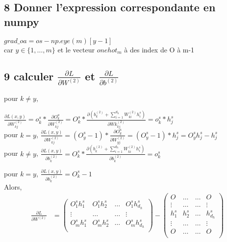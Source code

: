 \documentclass[12pt]{article}
\begin{document}
 \subsection{8 Donner l'expression correspondante en numpy}
$grad\_oa = os - np.eye(m)[y-1]$\\
car $y \in \{1,\dots,m\}$ et le vecteur $onehot_m$ à des index de O à m-1

 \subsection{9 calculer $\frac{\partial L}{\partial W^{(2)}}$ et $\frac{\partial L}{\partial b^{(2)}}$}
pour $k \neq y$,

$\frac{\partial L(x,y)}{\partial W_{kj}^{(2)}} = o_k^s*\frac{\partial O_k^a}{\partial W_{kj}^{(2)}}=O_k^s*\frac{\partial (b_k^{(2)} + \sum_{i=1}^{d_h}W_{ki}^{(2)}h_i^s)}{\partial Wk_{kj}^{(2)}} = o_k^s*h_j^s$\\

pour $k=y$,
$\frac{\partial L(x,y)}{\partial W_{kj}^{(2)}} = (O_y^s-1)*\frac{\partial O_y^a}{\partial W_{yj}^{(2)}} = (O_y^s-1)*h_j^s=O_y^sh_j^s-h_j^s$\\

pour $k \neq y$,
$\frac{\partial L(x,y)}{\partial b_k^{(2)}} = O_k^s*\frac{\partial (b_k^{(2)} + \sum_{i=1}^{d_h}W_{ki}^{(2)}h_i^s)}{\partial b_k^{(2)}} = o_k^s$

pour $k = y$,
$\frac{\partial L(x,y)}{\partial b_k^{(2)}} = O_k^s - 1$\\
Alors,\\
\begin{align*} 
    \frac{\partial L}{\partial W^{(2)}}
&=
     \left(
       \begin{array}{rrrr}
         O_1^sh_1^s &   O_1^sh_2^s &   \dots &   O_1^sh_{d_h}^s \\
        \vdots &  \dots &   \dots&   \vdots \\
         O_m^sh_1^s &   O_m^sh_2^s &   \dots &   O_m^sh_{d_h}^s \\
       \end{array}
      \right)  - 
	\left(
     \begin{array}{rrrr}
         O &   \dots &   \dots &   O\\
        \vdots &  \dots &   \dots&   \vdots \\
         h_1^s & h_2^s & \dots &h_{d_h}^s \\
 	\vdots &  \dots &   \dots&   \vdots \\
	O &   \dots &   \dots &   O\\
       \end{array}
     \right)
\end{align*}
\end{document}
